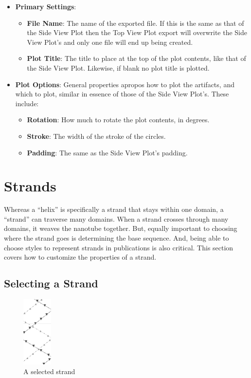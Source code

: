 \documentclass[titlepage]{article}
\begin{document}
\begin{itemize}
	\item \textbf{Primary Settings}: 
	\begin{itemize}
		\item \textbf{File Name}: The name of the exported file. If this is the same as that of the Side View Plot then the Top View Plot export will overwrite the Side View Plot's and only one file will end up being created.
		\item \textbf{Plot Title}: The title to place at the top of the plot contents, like that of the Side View Plot. Likewise, if blank no plot title is plotted.
	\end{itemize}
	
	\item \textbf{Plot Options}: General properties apropos how to plot the artifacts, and which to plot, similar in essence of those of the Side View Plot's. These include:
	\begin{itemize}
		\item \textbf{Rotation}: How much to rotate the plot contents, in degrees.
		\item \textbf{Stroke}: The width of the stroke of the circles.
		\item \textbf{Padding}: The same as the Side View Plot's padding.
	\end{itemize}
\end{itemize}

\section{Strands}

Whereas a ``helix'' is specifically a strand that stays within one domain, a ``strand'' can traverse many domains. When a strand crosses through many domains, it weaves the nanotube together. But, equally important to choosing where the strand goes is determining the base sequence. And, being able to choose styles to represent strands in publications is also critical. This section covers how to customize the properties of a strand.

\subsection{Selecting a Strand}

\begin{figure}[h] \label{fig:selected-strand}
	\centering
	\includegraphics[height=1.4in]{selected-strand.png}
	\caption{A selected strand}
\end{figure}
\end{document}
